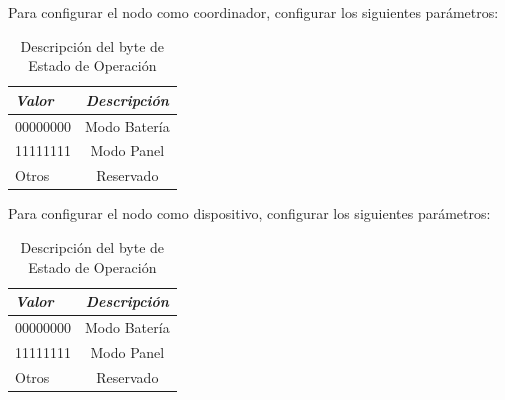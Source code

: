 Para configurar el nodo como coordinador, configurar los siguientes parámetros:
\begin{table}[ht]
	\centering
	\caption{Descripción del byte de Estado de Operación}
	\begin{tabular}{@{} l *1c @{}}    \toprule
		\emph{\textbf{Valor}} & \emph{\textbf{Descripción}}\\
		\midrule
		00000000 &  Modo Batería\\
		11111111 &  Modo Panel\\
		Otros & Reservado\\
		\bottomrule
		\hline
	\end{tabular}
	\label{tab:paracoo}
\end{table}

Para configurar el nodo como dispositivo, configurar los siguientes parámetros:
\begin{table}[ht]
	\centering
	\caption{Descripción del byte de Estado de Operación}
	\begin{tabular}{@{} l *1c @{}}    \toprule
		\emph{\textbf{Valor}} & \emph{\textbf{Descripción}}\\
		\midrule
		00000000 &  Modo Batería\\
		11111111 &  Modo Panel\\
		Otros & Reservado\\
		\bottomrule
		\hline
	\end{tabular}
	\label{tab:paradevi}
\end{table}

